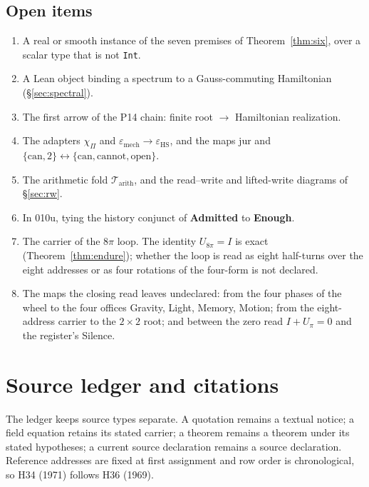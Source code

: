 \documentclass[11pt,a4paper]{article}
\newcommand{\emech}{\varepsilon_{\mathrm{mech}}}\newcommand{\eHS}{\varepsilon_{\mathrm{HS}}}
\newcommand{\bs}[1]{\texttt{#1}}
\theoremstyle{plain}
\theoremstyle{definition}
\theoremstyle{remark}
\begin{document}
\subsection{Open items}
\begin{enumerate}[label=\arabic*.,ref=\arabic*,nosep]
\item A real or smooth instance of the seven premises of Theorem~\ref{thm:six}, over a scalar type that is not \bs{Int}.
\item A Lean object binding a spectrum to a Gauss-commuting Hamiltonian (\S\ref{sec:spectral}).
\item The first arrow of the P14 chain: finite root $\to$ Hamiltonian realization.
\item The adapters $\chi_\Pi$ and $\emech\to\eHS$, and the maps $\mathrm{jur}$ and $\{\mathrm{can},2\}\leftrightarrow\{\mathrm{can},\mathrm{cannot},\mathrm{open}\}$.
\item The arithmetic fold $\mathcal T_{\mathrm{arith}}$, and the read--write and lifted-write diagrams of \S\ref{sec:rw}.
\item In 010u, tying the history conjunct of \textbf{Admitted} to \textbf{Enough}.
\item\label{oi:loop} The carrier of the $8\pi$ loop. The identity $U_{8\pi}=I$ is exact (Theorem~\ref{thm:endure}); whether the loop is read as eight half-turns over the eight addresses or as four rotations of the four-form is not declared.
\item\label{oi:maps} The maps the closing read leaves undeclared: from the four phases of the wheel to the four offices Gravity, Light, Memory, Motion; from the eight-address carrier to the $2\times2$ root; and between the zero read $I+U_\pi=0$ and the register's Silence.
\end{enumerate}
\clearpage
\appendix
\renewcommand{\thesection}{\Alph{section}}
\renewcommand{\thesubsection}{\thesection.\arabic{subsection}}
\section{Source ledger and citations}\label{app:A}
The ledger keeps source types separate. A quotation remains a textual notice; a field equation retains its stated carrier; a theorem remains a theorem under its stated hypotheses; a current source declaration remains a source declaration. Reference addresses are fixed at first assignment and row order is chronological, so H34 (1971) follows H36 (1969).
\end{document}
